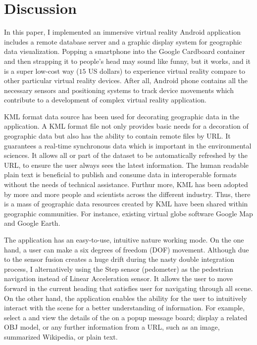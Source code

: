 \chapter{Discussion}
\label{chapter-discussion}

In this paper, I implemented an immersive virtual reality Android application includes a remote database server and a graphic display system for geographic data visualization. Popping a smartphone into the Google Cardboard container and then strapping it to people's head may sound like funny, but it works, and it is a super low-cost way ($15$ US dollars) to experience virtual reality compare to other particular virtual reality devices. After all, Android phone contains all the necessary sensors and positioning systems to track device movements which contribute to a development of complex virtual reality application. 

KML format data source has been used for decorating geographic data in the application. A KML format file not only provides basic needs for a decoration of geographic data but also has the ability to contain remote files by URL. It guarantees a real-time synchronous data which is important in the environmental sciences. It allows all or part of the dataset to be automatically refreshed by the URL, to ensure the user always sees the latest information. The human readable plain text is beneficial to publish and consume data in interoperable formats without the needs of technical assistance. Furthur more, KML has been adopted by more and more people and scientists across the different industry. Thus, there is a mass of geographic data resources created by KML have been shared within geographic communities. For instance, existing virtual globe software Google Map and Google Earth.

The application has an easy-to-use, intuitive nature working mode. On the one hand, a user can make a six degrees of freedom (DOF) movement. Although due to the sensor fusion creates a huge drift during the nasty double integration process, I alternatively using the Step sensor (pedometer) as the pedestrian navigation instead of Linear Acceleration sensor. It allows the user to move forward in the current heading that satisfies user for navigating through all scene. On the other hand, the application enables the ability for the user to intuitively interact with the scene for a better understanding of information. For example, select a  and view the details of the  on a popup message board; display a  related OBJ model, or any further information from a URL, such as an image, summarized Wikipedia, or plain text.

